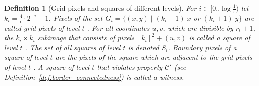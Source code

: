 \documentclass[11pt,english]{article}
\newtheorem{definition}{Definition}[section]
\numberwithin{figure}{section}
\newcommand{\C}{{\mathcal C}}
\newcommand{\eps}{{\epsilon}}
\newcommand{\integerset}[1]{[0..{#1})}
\newcommand{\lind}{t}
\begin{document}
\begin{definition}[Grid pixels and squares of different levels]
\label{def:Grid_pixels_squares_of_different_levels}
For $i\in\integerset{\log\frac{1}{\eps}}$ let $k_{i}=\frac{4}{\eps}\cdot
2^{-i}-1$.
Pixels of the set $G_{i}=\{(x,y)\mid (k_{i}+1)|x$ or $(k_{i}+1)|y\}$ are called
\emph{grid pixels of level $\lind$ .} For all coordinates $u,v$, which are divisible by $r_\lind+1$,
the $k_{i}\times k_{i}$ subimage that consists of pixels $[k_{i}]^{2}+(u,v)$ is
called a \emph{square of level} $\lind$ . The set of all squares of level $\lind$  is denoted $S_{i}$.
{\em Boundary pixels} of a square of level $\lind$  are the pixels of the square which are adjacent to the grid pixels of level $\lind$ . A square of level $\lind$  that violates property $\C'$ (see Definition~\ref{def:border_connectedness}) is called a \emph{witness}.
\end{definition}
\end{document}
